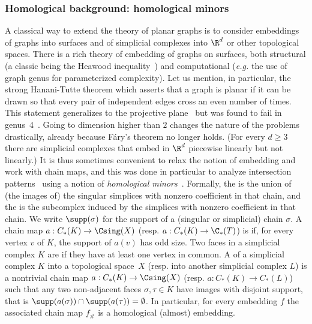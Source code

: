 \subsubsection{Homological background: homological minors}
%
A classical way to extend the theory of planar graphs is to consider embeddings of graphs into surfaces and of simplicial complexes into $\R^d$ or other topological spaces.
%
\medskip
%
There is a rich theory of embedding of graphs on surfaces, both structural (a classic being the Heawood inequality~\cite{ringel2012map}) and computational (\emph{e.g.} the use of graph genus for parameterized complexity). Let us mention, in particular, the strong Hanani-Tutte theorem which asserts that a graph is planar if it can be drawn so that every pair of independent edges cross an even number of times. This statement generalizes to the projective plane~\cite{pelsmajer2009strong,de2017direct} but was found to fail in genus~4~\cite{fulek2019counterexample}. 
%
\medskip
%
Going to dimension higher than $2$ changes the nature of the problems drastically, already because Fáry's theorem no longer holds. (For every $d \ge 3$ there are simplicial complexes that embed in $\R^d$ piecewise linearly but not linearly.) It is thus sometimes convenient to relax the notion of embedding and work with chain maps, and this was done in particular to analyze intersection patterns~\cite{hellyBetti,patakova2022bounding,steppingUp} using a notion of \emph{homological minors}~\cite{wagner2012minors}.
%
\medskip
%
Formally, the  is the union of (the images of) the singular simplices with nonzero coefficient in that chain, and the   is the subcomplex induced by the simplices with nonzero coefficient in that chain.  We write $\supp(\sigma)$ for the support of a (singular or simplicial) chain $\sigma$. A chain map $a:C_*(K)\to \Csing(X)$ (resp. $a:C_*(K)\to \C_*(T)$) is  if, for every vertex $v$ of $K$, the support of $a(v)$ has odd size. Two faces in a simplicial complex $K$ are  if they have at least one vertex in common.  A  of a simplicial complex $K$ into a topological space~$X$ (resp. into another simplicial complex $L$) is a nontrivial chain map $a:C_*(K)\to \Csing(X)$ (resp. $a:C_*(K)\to C_*(L)$) such that any two non-adjacent faces $\sigma,\tau \in K$ have images with disjoint support, that is $\supp(a(\sigma)) \cap \supp(a(\tau)) = \emptyset$. In particular, for every embedding $f$ the associated chain map $f_\#$ is a homological (almost) embedding.
